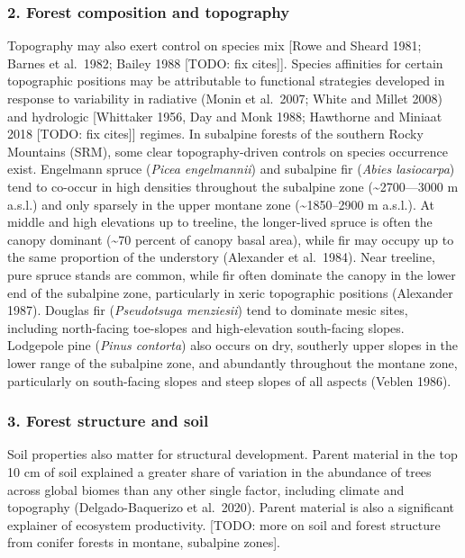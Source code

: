 \documentclass[
  12pt,
]{article}
\begin{document}
\hypertarget{forest-composition-and-topography}{%
\subsubsection{2. Forest composition and
topography}\label{forest-composition-and-topography}}

Topography may also exert control on species mix {[}Rowe and Sheard
1981; Barnes et al.~1982; Bailey 1988 {[}TODO: fix cites{]}{]}. Species
affinities for certain topographic positions may be attributable to
functional strategies developed in response to variability in radiative
(Monin et al.~2007; White and Millet 2008) and hydrologic {[}Whittaker
1956, Day and Monk 1988; Hawthorne and Miniaat 2018 {[}TODO: fix
cites{]}{]} regimes. In subalpine forests of the southern Rocky
Mountains (SRM), some clear topography-driven controls on species
occurrence exist. Engelmann spruce (\emph{Picea engelmannii}) and
subalpine fir (\emph{Abies lasiocarpa}) tend to co-occur in high
densities throughout the subalpine zone (\textasciitilde2700---3000 m
a.s.l.) and only sparsely in the upper montane zone
(\textasciitilde1850--2900 m a.s.l.). At middle and high elevations up
to treeline, the longer-lived spruce is often the canopy dominant
(\textasciitilde70 percent of canopy basal area), while fir may occupy
up to the same proportion of the understory (Alexander et al.~1984).
Near treeline, pure spruce stands are common, while fir often dominate
the canopy in the lower end of the subalpine zone, particularly in xeric
topographic positions (Alexander 1987). Douglas fir (\emph{Pseudotsuga
menziesii}) tend to dominate mesic sites, including north-facing
toe-slopes and high-elevation south-facing slopes. Lodgepole pine
(\emph{Pinus contorta}) also occurs on dry, southerly upper slopes in
the lower range of the subalpine zone, and abundantly throughout the
montane zone, particularly on south-facing slopes and steep slopes of
all aspects (Veblen 1986).

\hypertarget{forest-structure-and-soil}{%
\subsubsection{3. Forest structure and
soil}\label{forest-structure-and-soil}}

Soil properties also matter for structural development. Parent material
in the top 10 cm of soil explained a greater share of variation in the
abundance of trees across global biomes than any other single factor,
including climate and topography (Delgado-Baquerizo et al.~2020). Parent
material is also a significant explainer of ecosystem productivity.
{[}TODO: more on soil and forest structure from conifer forests in
montane, subalpine zones{]}.
\end{document}

